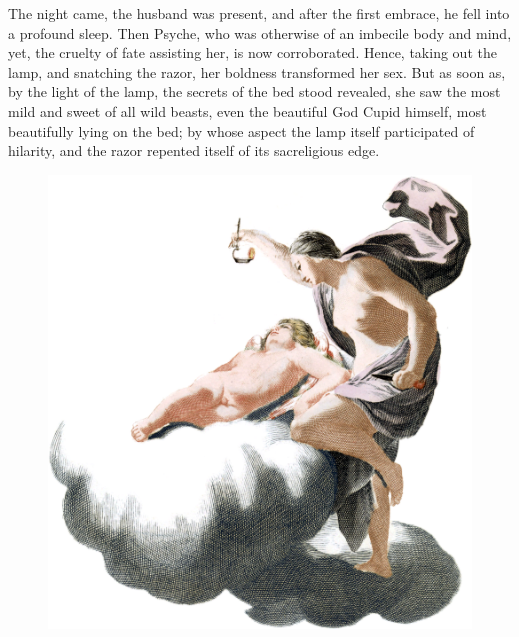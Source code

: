 \documentclass[12pt]{article}
\begin{document}
The night came, the husband was present, and after the first embrace, he fell
into a profound sleep. Then Psyche, who was otherwise of an imbecile body and
mind, yet, the cruelty of fate assisting her, is now corroborated. Hence,
taking out the lamp, and snatching the razor, her boldness transformed her sex.
But as soon as, by the light of the lamp, the secrets of the bed stood
revealed, she saw the most mild and sweet of all wild beasts, even the
beautiful God Cupid himself, most beautifully lying on the bed; by whose aspect
the lamp itself participated of hilarity, and the razor repented itself of its
sacreligious edge.

\begin{figure}
\centering
\includegraphics[width=\textwidth,totalheight=\textheight,keepaspectratio]{apuleius_cupid_and_psyche.png}
\end{figure}
\end{document}

